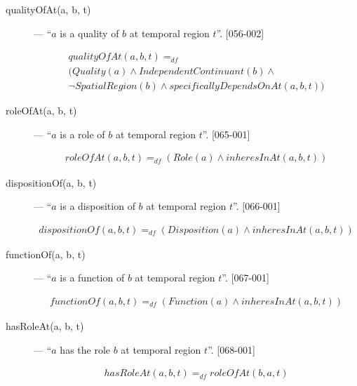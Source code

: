 \documentclass{article}
\newcommand{\DF}{\ensuremath{=_{df}}}
\begin{document}
\begin{description}
\item[qualityOfAt(a, b, t)] --- ``$a$ is a quality of $b$ at temporal region $t$''. [056-002]

\begin{equation}
\begin{split}
qualityOfAt(a, b, t) \DF \\
(Quality(a) \wedge IndependentContinuant(b) \wedge \\
{\neg}SpatialRegion(b) \wedge specificallyDependsOnAt(a, b, t))
\end{split}
\end{equation}

\item[roleOfAt(a, b, t)] --- ``$a$ is a role of $b$ at temporal region $t$''. [065-001]

\begin{equation}
\begin{split}
roleOfAt(a, b, t) \DF (Role(a) \wedge inheresInAt(a, b, t))
\end{split}
\end{equation}

\item[dispositionOf(a, b, t)] --- ``$a$ is a disposition of $b$ at temporal region $t$''. [066-001]

\begin{equation}
\begin{split}
dispositionOf(a, b, t) \DF (Disposition(a) \wedge inheresInAt(a, b, t))
\end{split}
\end{equation}

\item[functionOf(a, b, t)] --- ``$a$ is a function of $b$ at temporal region $t$''. [067-001]

\begin{equation}
\begin{split}
functionOf(a, b, t) \DF (Function(a) \wedge inheresInAt(a, b, t))
\end{split}
\end{equation}

\item[hasRoleAt(a, b, t)] --- ``$a$ has the role $b$ at temporal region $t$''. [068-001]

\begin{equation}
\begin{split}
hasRoleAt(a, b, t) \DF roleOfAt(b, a, t)
\end{split}
\end{equation}


\end{description}
\end{document}

